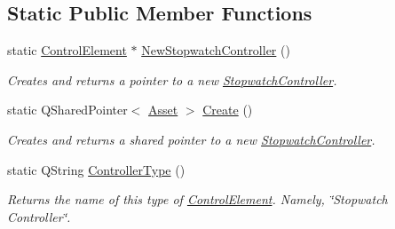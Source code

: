 \subsection*{Static Public Member Functions}
\begin{DoxyCompactItemize}
\item 
\hypertarget{class_picto_1_1_stopwatch_controller_ae845ab63e70fa9e4c91ea22278fca4ba}{static \hyperlink{class_picto_1_1_control_element}{Control\-Element} $\ast$ \hyperlink{class_picto_1_1_stopwatch_controller_ae845ab63e70fa9e4c91ea22278fca4ba}{New\-Stopwatch\-Controller} ()}\label{class_picto_1_1_stopwatch_controller_ae845ab63e70fa9e4c91ea22278fca4ba}

\begin{DoxyCompactList}\small\item\em Creates and returns a pointer to a new \hyperlink{class_picto_1_1_stopwatch_controller}{Stopwatch\-Controller}. \end{DoxyCompactList}\item 
\hypertarget{class_picto_1_1_stopwatch_controller_addcb9d437ed72621e14ea9287138130f}{static Q\-Shared\-Pointer$<$ \hyperlink{class_picto_1_1_asset}{Asset} $>$ \hyperlink{class_picto_1_1_stopwatch_controller_addcb9d437ed72621e14ea9287138130f}{Create} ()}\label{class_picto_1_1_stopwatch_controller_addcb9d437ed72621e14ea9287138130f}

\begin{DoxyCompactList}\small\item\em Creates and returns a shared pointer to a new \hyperlink{class_picto_1_1_stopwatch_controller}{Stopwatch\-Controller}. \end{DoxyCompactList}\item 
\hypertarget{class_picto_1_1_stopwatch_controller_ad81d4ac7b16a0da6b656393df6c679f9}{static Q\-String \hyperlink{class_picto_1_1_stopwatch_controller_ad81d4ac7b16a0da6b656393df6c679f9}{Controller\-Type} ()}\label{class_picto_1_1_stopwatch_controller_ad81d4ac7b16a0da6b656393df6c679f9}

\begin{DoxyCompactList}\small\item\em Returns the name of this type of \hyperlink{class_picto_1_1_control_element}{Control\-Element}. Namely, \char`\"{}\-Stopwatch Controller\char`\"{}. \end{DoxyCompactList}\end{DoxyCompactItemize}
